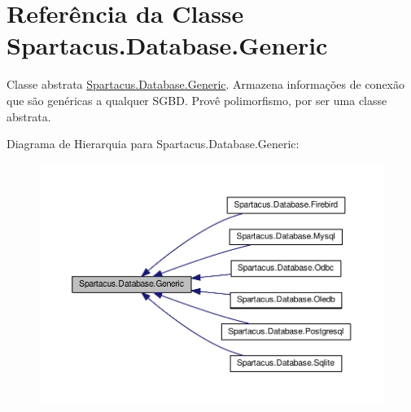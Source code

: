\hypertarget{classSpartacus_1_1Database_1_1Generic}{\section{Referência da Classe Spartacus.\+Database.\+Generic}
\label{classSpartacus_1_1Database_1_1Generic}
}


Classe abstrata \hyperlink{classSpartacus_1_1Database_1_1Generic}{Spartacus.\+Database.\+Generic}. Armazena informações de conexão que são genéricas a qualquer S\+G\+B\+D. Provê polimorfismo, por ser uma classe abstrata.  




Diagrama de Hierarquia para Spartacus.\+Database.\+Generic\+:\nopagebreak
\begin{figure}[H]
\begin{center}
\leavevmode
\includegraphics[width=350pt]{classSpartacus_1_1Database_1_1Generic__inherit__graph}
\end{center}
\end{figure}
